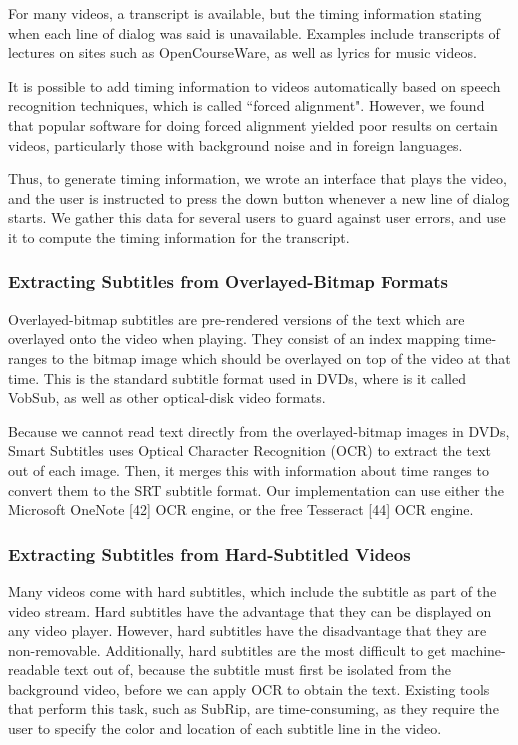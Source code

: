 \documentclass{sigchi}
\begin{document}
For many videos, a transcript is available, but the timing information
stating when each line of dialog was said is unavailable.
Examples include transcripts of lectures on sites such as
OpenCourseWare, as well as lyrics for music videos.

It is possible to add timing information to videos automatically based on speech recognition techniques, which is called ``forced alignment".
However, we found that popular software for doing forced alignment
yielded poor results on certain videos, particularly those with background
noise and in foreign languages.

Thus, to generate timing information,
we wrote an interface that plays the video,
and the user is instructed to press the down button whenever a new
line of dialog starts.
We gather this data for several users to guard against user errors,
and use it to compute the timing information for the transcript.

\subsubsection{Extracting Subtitles from Overlayed-Bitmap Formats}

Overlayed-bitmap subtitles are pre-rendered versions of the text which are overlayed onto the video when playing. They consist of an index mapping time-ranges to the bitmap image which should be overlayed on top of the video at that time. This is the standard subtitle format used in DVDs, where is it called VobSub, as well as other optical-disk video formats.

Because we cannot read text directly from the overlayed-bitmap images in DVDs, Smart Subtitles uses Optical Character Recognition (OCR) to extract the text out of each image. Then, it merges this with information about time ranges to convert them to the SRT subtitle format. Our implementation can use either the Microsoft OneNote [42] OCR engine, or the free Tesseract [44] OCR engine.

\subsubsection{Extracting Subtitles from Hard-Subtitled Videos}

Many videos come with hard subtitles, which include the subtitle as part of the video stream. Hard subtitles have the advantage that they can be displayed on any video player. However, hard subtitles have the disadvantage that they are non-removable. Additionally, hard subtitles are the most difficult to get machine-readable text out of, because the subtitle must first be isolated from the background video, before we can apply OCR to obtain the text. Existing tools that perform this task, such as SubRip, are time-consuming, as they require the user to specify the color and location of each subtitle line in the video.
\end{document}
